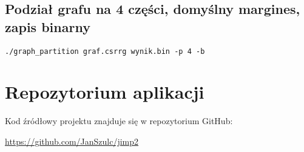 \documentclass{article}
\begin{document}
\subsection{Podział grafu na 4 części, domyślny margines, zapis binarny}
\begin{verbatim}
./graph_partition graf.csrrg wynik.bin -p 4 -b
\end{verbatim}

\section{Repozytorium aplikacji}
Kod źródłowy projektu znajduje się w repozytorium GitHub:
\begin{center}
\href{https://github.com/JanSzulc/jimp2}{https://github.com/JanSzulc/jimp2}
\end{center}
\end{document}
